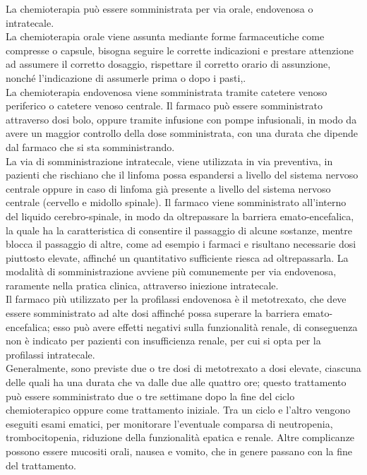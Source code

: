 La chemioterapia può essere somministrata per via orale, endovenosa o intratecale.\\
La chemioterapia orale viene assunta mediante forme farmaceutiche come compresse o capsule, bisogna seguire le 
corrette indicazioni e prestare attenzione ad assumere il corretto dosaggio, rispettare il corretto orario di 
assunzione, nonché l’indicazione di assumerle prima o dopo i pasti\cite{LYMPHACTION},\cite{CHEMOUK}.\\
La chemioterapia endovenosa viene somministrata tramite catetere venoso periferico o catetere venoso centrale. 
Il farmaco può essere somministrato attraverso dosi bolo, oppure tramite infusione con pompe infusionali, in modo da 
avere un maggior controllo della dose somministrata, con una durata che dipende dal farmaco che si sta somministrando.\\
La via di somministrazione intratecale, viene utilizzata in via preventiva, in pazienti che rischiano che il linfoma 
possa espandersi a livello del sistema nervoso centrale oppure in caso di linfoma già presente a livello del sistema 
nervoso centrale (cervello e midollo spinale)\cite{LYMPHACTION}.
Il farmaco viene somministrato all’interno del liquido cerebro-spinale, in modo da oltrepassare la barriera 
emato-encefalica, la quale ha la caratteristica di consentire il passaggio di alcune sostanze, mentre blocca il 
passaggio di altre, come ad esempio i farmaci e risultano necessarie dosi piuttosto elevate, affinché un quantitativo 
sufficiente riesca ad oltrepassarla. La modalità di somministrazione avviene più comunemente per via endovenosa, 
raramente nella pratica clinica, attraverso iniezione intratecale\cite{CNS}.\\
Il farmaco più utilizzato per la profilassi endovenosa è il metotrexato, che deve essere somministrato ad alte dosi 
affinché possa superare la barriera emato-encefalica; esso può avere effetti negativi sulla funzionalità renale, 
di conseguenza non è indicato per pazienti con insufficienza renale, per cui si opta per la profilassi intratecale.\\
Generalmente, sono previste due o tre dosi di metotrexato a dosi elevate, ciascuna delle quali ha una durata che va 
dalle due alle quattro ore; questo trattamento può essere somministrato due o tre settimane dopo la fine del ciclo 
chemioterapico oppure come trattamento iniziale. Tra un ciclo e l’altro vengono eseguiti esami 
ematici, per monitorare l'eventuale comparsa di neutropenia, trombocitopenia, 
riduzione della funzionalità epatica e renale. Altre complicanze possono essere mucositi orali, nausea e vomito, 
che in genere passano con la fine del trattamento\cite{CNS}.\\

